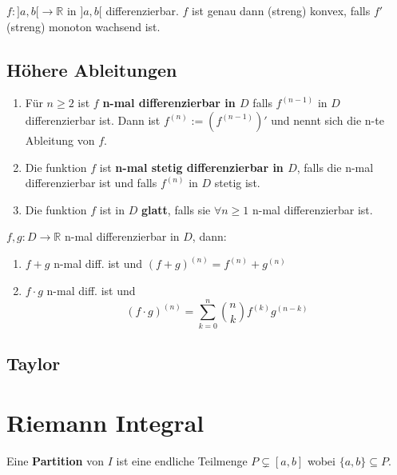 \documentclass[8pt,a4paper,twocolumn,table]{extarticle}
\newcommand{\R}{\mathbb{R}}
\begin{document}
\begin{satz}{4.29}
    $f: ]a, b[ \to \R$ in $]a, b[$ differenzierbar. $f$ ist genau dann (streng) konvex, falls $f'$ (streng) monoton wachsend ist.
\end{satz}

\subsection{Höhere Ableitungen}

\begin{definition}{4.32}
    \begin{enumerate}
        \item Für $n \ge 2$ ist $f$ \textbf{n-mal differenzierbar in $D$} falls $f^{(n-1)}$ in $D$ differenzierbar ist.
              Dann ist $f^(n) := (f^{(n - 1)})'$ und nennt sich die n-te Ableitung von $f$.
        \item Die funktion $f$ ist \textbf{n-mal stetig differenzierbar in $D$}, falls die n-mal differenzierbar ist und falls $f^{(n)}$ in $D$ stetig ist.
        \item Die funktion $f$ ist in $D$ \textbf{glatt}, falls sie $\forall n \ge 1$ n-mal differenzierbar ist.
    \end{enumerate}
\end{definition}

\begin{satz}{4.34}
    $f,g: D \to \R$ n-mal differenzierbar in $D$, dann:
    \begin{enumerate}
        \item $f + g$ n-mal diff. ist und $(f + g)^{(n)} = f^{(n)} + g^{(n)}$
        \item $f \cdot g$ n-mal diff. ist und
              \[ (f \cdot g)^{(n)} = \sum_{k=0}^n \binom{n}{k} f^{(k)}g^{(n - k)} \]
    \end{enumerate}
\end{satz}

\subsection{Taylor}

\section{Riemann Integral}

\begin{definition}{5.1}
    Eine \textbf{Partition} von $I$ ist eine endliche Teilmenge $P \subsetneq [a, b]$ wobei $\{a,b\} \subseteq P$.
\end{definition}
\end{document}

